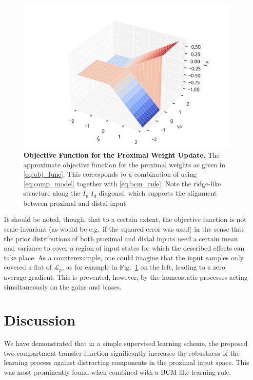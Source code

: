 \documentclass[10pt,a4paper,twocolumn]{article}
\begin{document}
		\begin{figure}
			\includegraphics[width=\columnwidth]{obj_func}
			\caption{{\bf Objective Function for the Proximal Weight Update.} The 
			approximate objective function for the proximal weights as given in
			\eqref{eq:obj_func}. This corresponds to a combination of using 
		\eqref{eq:comp_model} together with \eqref{eq:bcm_rule}. Note the ridge-like
		structure along the $I_p$-$I_d$ diagonal, which supports the alignment between
		proximal and distal input.}
		\label{fig:obj_func}
		\end{figure}
		
		It should be noted, though, that to a certain extent, the objective function is not
		scale-invariant (as would be e.g.\ if the squared error was used) in the sense 
		that the prior distributions of both proximal 
		and distal inputs need a certain mean and variance to cover a region of input
		states for which the described effects can take place. As a counterexample,
		one could imagine that the input samples only covered a flat of $\mathcal{L}_p$, as
		for example in Fig.~\ref{fig:obj_func} on the left, leading to a zero average gradient. 
		This is prevented, however, by the homeostatic processes acting simultaneously on the gains
		and biases.
		
		
		\section{Discussion}
		
		We have demonstrated that in a simple supervised learning scheme, the
		proposed two-compartment transfer function significantly increases
		the robustness of the learning process against distracting components
		in the proximal input space. This was most prominently found when
		combined with a BCM-like learning rule.
		
\end{document}
